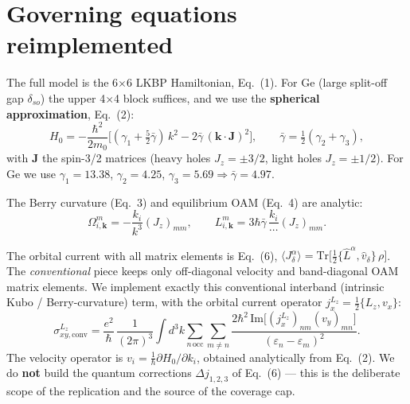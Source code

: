 \documentclass[11pt]{article}
\begin{document}
\section{Governing equations reimplemented}
The full model is the 6$\times$6 LKBP Hamiltonian, Eq.~(1). For Ge (large split-off gap $\delta_{so}$)
the upper 4$\times$4 block suffices, and we use the \textbf{spherical approximation}, Eq.~(2):
\begin{equation}
H_0 = -\frac{\hbar^{2}}{2m_0}\Big[(\gamma_1+\tfrac52\bar\gamma)\,k^2 - 2\bar\gamma\,(\mathbf{k}\cdot\mathbf{J})^2\Big],
\qquad \bar\gamma=\tfrac12(\gamma_2+\gamma_3),
\end{equation}
with $\mathbf{J}$ the spin-3/2 matrices (heavy holes $J_z=\pm3/2$, light holes $J_z=\pm1/2$).
For Ge we use $\gamma_1=13.38$, $\gamma_2=4.25$, $\gamma_3=5.69 \Rightarrow \bar\gamma=4.97$.

The Berry curvature (Eq.~3) and equilibrium OAM (Eq.~4) are analytic:
\begin{equation}
\Omega^{m}_{i,\mathbf k}=-\frac{k_i}{k^3}(J_z)_{mm},\qquad
L^{m}_{i,\mathbf k}=3\hbar\bar\gamma\,\frac{k_i}{\cdots}(J_z)_{mm}.
\end{equation}

The orbital current with all matrix elements is Eq.~(6),
$\langle J^\alpha_\delta\rangle=\mathrm{Tr}\big[\tfrac12\{\hat L^\alpha,\hat v_\delta\}\,\rho\big]$.
The \emph{conventional} piece keeps only off-diagonal velocity and band-diagonal OAM matrix
elements. We implement exactly this conventional interband (intrinsic Kubo / Berry-curvature)
term, with the orbital current operator $j^{L_z}_x=\tfrac12\{L_z,v_x\}$:
\begin{equation}
\sigma^{L_z}_{xy,\mathrm{conv}}
= \frac{e^2}{\hbar}\,\frac{1}{(2\pi)^3}\int d^3k \sum_{n\,\mathrm{occ}}\sum_{m\neq n}
\frac{2\hbar^2\,\mathrm{Im}\big[(j^{L_z}_x)_{nm}(v_y)_{mn}\big]}{(\varepsilon_n-\varepsilon_m)^2}.
\end{equation}
The velocity operator is $v_i=\tfrac{1}{\hbar}\partial H_0/\partial k_i$, obtained analytically from
Eq.~(2). We do \textbf{not} build the quantum corrections $\Delta j_{1,2,3}$ of Eq.~(6) --- this is
the deliberate scope of the replication and the source of the coverage cap.
\end{document}
